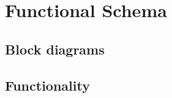 %
\chapter{Functional Schema}
\label{Functional Schema}



\section{Block diagrams}


\section{Functionality}

